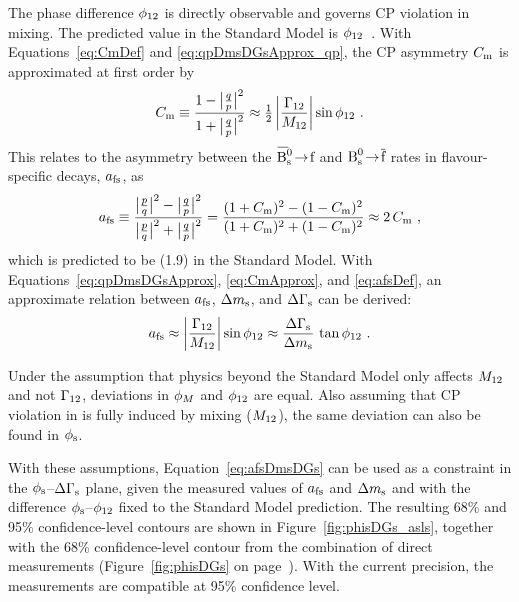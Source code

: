 The phase difference $\phi_\text{12}$ is directly observable and governs CP violation in mixing. The predicted value in the Standard Model is
$\phi_\text{12}$\unitsp\invps~\cite{Lenz:2006hd,*Lenz:2011ti}. With Equations~\ref{eq:CmDef} and
\ref{eq:qpDmsDGsApprox_qp}, the CP asymmetry $C_\text{m}$ is approximated at first order by
\begin{equation}
  \label{eq:CmApprox}
  C_\text{m} \equiv \frac{1-\big|\tfrac{q}{p}\big|^2}{1+\big|\tfrac{q}{p}\big|^2} \approx \tfrac{1}{2}\left|\frac{\Gamma_\text{12}}{M_\text{12}}\right|\sin\phi_\text{12} \ .
\end{equation}
This relates to the asymmetry between the $\Bsbartof$ and $\text{B}_\text{s}^\text{0}\!\to\!\overline{\text{f}}$ rates in flavour-specific decays, $a_\text{fs}$, as
\begin{equation}
  \label{eq:afsDef}
  a_\text{fs} \equiv \frac{\big|\tfrac{p}{q}\big|^2-\big|\tfrac{q}{p}\big|^2}{\big|\tfrac{p}{q}\big|^2+\big|\tfrac{q}{p}\big|^2} = \frac{(1+C_\text{m})^2 - (1-C_\text{m})^2}{(1+C_\text{m})^2 + (1-C_\text{m})^2} \approx 2\,C_\text{m}
  \ ,
\end{equation}
which is predicted to be (1.9) in the Standard Model. With Equations~\ref{eq:qpDmsDGsApprox}, \ref{eq:CmApprox},
and \ref{eq:afsDef}, an approximate relation between $a_\text{fs}$, $\Delta m_\text{s}$, and $\Delta\Gamma_\text{s}$ can be derived:
\begin{equation}
  \label{eq:afsDmsDGs}
  a_\text{fs} \approx \left|\frac{\Gamma_\text{12}}{M_\text{12}}\right|\sin\phi_\text{12} \approx \frac{\Delta\Gamma_\text{s}}{\Delta m_\text{s}}\,\tan\phi_\text{12} \ .
\end{equation}

Under the assumption that physics beyond the Standard Model only affects $M_\text{12}$ and not $\Gamma_\text{12}$, deviations in $\phi_M$ and $\phi_\text{12}$ are
equal. Also assuming that CP violation in \BstoJpsiKK{} is fully induced by mixing ($M_\text{12}$), the same deviation can also be found in
$\phi_\text{s}$.

With these assumptions, Equation~\ref{eq:afsDmsDGs} can be used as a constraint in the $\phi_\text{s}$--$\Delta\Gamma_\text{s}$ plane, given the measured
values of $a_\text{fs}$ and $\Delta m_\text{s}$ and with the difference $\phi_\text{s}$--$\phi_\text{12}$ fixed to the Standard Model prediction. The resulting 68\% and 95\%
confidence-level contours are shown in Figure~\ref{fig:phisDGs_asls}, together with the 68\% confidence-level contour from the combination
of direct measurements (Figure~\ref{fig:phisDGs} on page~\pageref{fig:phisDGs}). With the current precision, the measurements are
compatible at 95\% confidence level.

